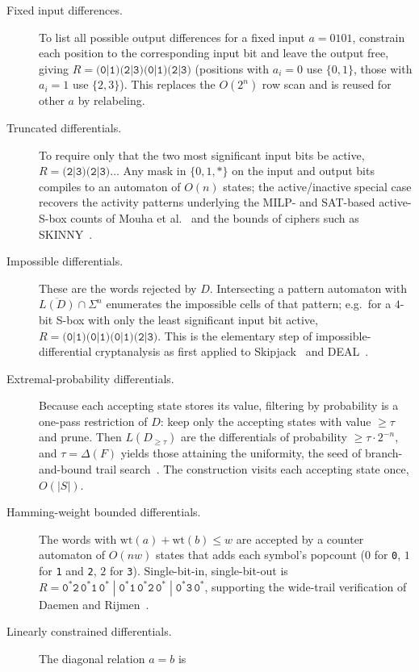 \documentclass[runningheads]{llncs}
\newcommand{\Sig}{\Sigma}
\newcommand{\re}[1]{\texttt{#1}}
\newcommand{\wt}{\mathrm{wt}}
\begin{document}
\begin{description}
\item[Fixed input differences.] To list all possible output differences for a
  fixed input $a=0101$, constrain each position to the corresponding input bit and
  leave the output free, giving $R=\re{(0|1)(2|3)(0|1)(2|3)}$ (positions with
  $a_i=0$ use $\{0,1\}$, those with $a_i=1$ use $\{2,3\}$). This replaces the
  $O(2^{n})$ row scan and is reused for other $a$ by relabeling.
\item[Truncated differentials.] To require only that the two most significant
  input bits be active, $R=\re{(2|3)(2|3)..}$. Any mask in $\{0,1,*\}$ on the
  input and output bits compiles to an automaton of $O(n)$ states; the
  active/inactive special case recovers the activity patterns underlying the
  MILP- and SAT-based active-S-box counts of Mouha et al.~\cite{mouha} and the
  bounds of ciphers such as SKINNY~\cite{skinny}.
\item[Impossible differentials.] These are the words rejected by $D$. Intersecting
  a pattern automaton with $\overline{L(D)}\cap\Sig^{n}$ enumerates the impossible
  cells of that pattern; e.g.\ for a $4$-bit S-box with only the least significant
  input bit active, $R=\re{(0|1)(0|1)(0|1)(2|3)}$. This is the elementary step of
  impossible-differential cryptanalysis as first applied to
  Skipjack~\cite{skipjack} and DEAL~\cite{deal}.
\item[Extremal-probability differentials.] Because each accepting state stores its
  value, filtering by probability is a one-pass restriction of $D$: keep only the
  accepting states with value $\ge\tau$ and prune. Then $L(D_{\ge\tau})$ are the
  differentials of probability $\ge\tau\cdot 2^{-n}$, and $\tau=\Delta(F)$ yields
  those attaining the uniformity, the seed of branch-and-bound trail
  search~\cite{matsui}. The construction visits each accepting state once,
  $O(|S|)$.
\item[Hamming-weight bounded differentials.] The words with $\wt(a)+\wt(b)\le w$
  are accepted by a counter automaton of $O(nw)$ states that adds each symbol's
  popcount ($0$ for \re{0}, $1$ for \re{1} and \re{2}, $2$ for \re{3}).
  Single-bit-in, single-bit-out is
  $R=\re{0}^{*}\re{2}\,\re{0}^{*}\re{1}\,\re{0}^{*}\;|\;\re{0}^{*}\re{1}\,\re{0}^{*}\re{2}\,\re{0}^{*}\;|\;\re{0}^{*}\re{3}\,\re{0}^{*}$,
  supporting the wide-trail
  verification of Daemen and Rijmen~\cite{rijndael}.
\item[Linearly constrained differentials.] The diagonal relation $a=b$ is

\end{description}
\end{document}

